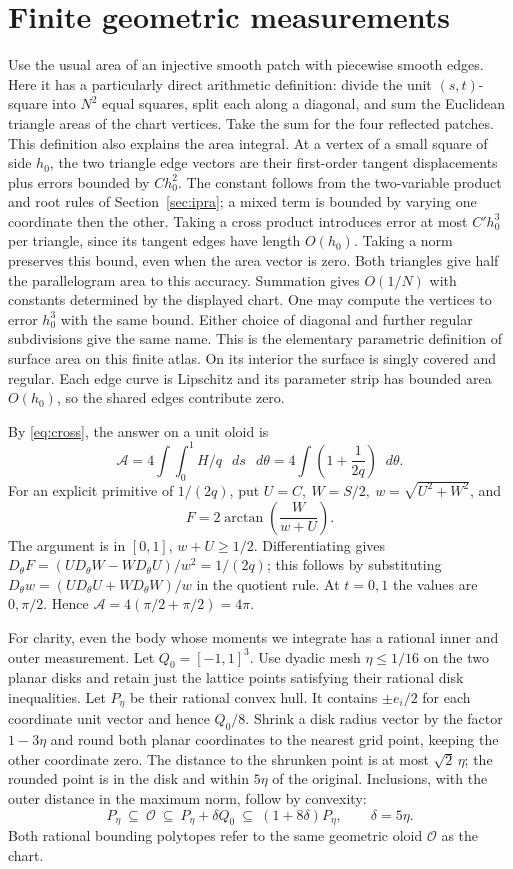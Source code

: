 \documentclass[11pt,letterpaper]{article}
\newcommand{\sect}[1]{\section[#1]{\color{ink}#1}}
\newcommand{\subt}[1]{\par\medskip\noindent{\color{sea}\bfseries #1}\enspace}
\newcommand{\dd}{\mathop{}\!d}
\newcommand{\Dth}{D_{\theta}}
\begin{document}
\newpage
\sect{Finite geometric measurements}\label{sec:measure}
\subt{Area.}
Use the usual area of an injective smooth patch with piecewise smooth edges. Here it has a particularly direct arithmetic definition: divide the unit \((s,t)\)-square into \(N^2\) equal squares, split each along a diagonal, and sum the Euclidean triangle areas of the chart vertices. Take the sum for the four reflected patches. This definition also explains the area integral. At a vertex of a small square of side \(h_0\), the two triangle edge vectors are their first-order tangent displacements plus errors bounded by \(Ch_0^2\). The constant follows from the two-variable product and root rules of Section~\ref{sec:ipra}; a mixed term is bounded by varying one coordinate then the other. Taking a cross product introduces error at most \(C' h_0^3\) per triangle, since its tangent edges have length \(O(h_0)\). Taking a norm preserves this bound, even when the area vector is zero. Both triangles give half the parallelogram area to this accuracy. Summation gives \(O(1/N)\) with constants determined by the displayed chart. One may compute the vertices to error \(h_0^3\) with the same bound. Either choice of diagonal and further regular subdivisions give the same name. This is the elementary parametric definition of surface area on this finite atlas. On its interior the surface is singly covered and regular. Each edge curve is Lipschitz and its parameter strip has bounded area \(O(h_0)\), so the shared edges contribute zero.

By \eqref{eq:cross}, the answer on a unit oloid is
\[
 \mathcal A=4\int\!\int_0^1 H/q\,\dd s\,\dd\theta
       =4\int\left(1+\frac1{2q}\right)\dd\theta .
\]
For an explicit primitive of \(1/(2q)\), put \(U=C,\ W=S/2,\ w=\sqrt{U^2+W^2}\), and
\[
 F=2\arctan\!\left(\frac{W}{w+U}\right).
\]
The argument is in \([0,1]\), \(w+U\ge1/2\). Differentiating gives
\(\Dth F=(U\Dth W-W\Dth U)/w^2=1/(2q)\);
this follows by substituting \(\Dth w=(U\Dth U+W\Dth W)/w\) in the quotient rule. At \(t=0,1\) the values are \(0,\pi/2\). Hence \(\mathcal A=4(\pi/2+\pi/2)=4\pi\).

\subt{An independent solid-volume definition.}
For clarity, even the body whose moments we integrate has a rational inner and outer measurement. Let \(Q_0=[-1,1]^3\). Use dyadic mesh \(\eta\le1/16\) on the two planar disks and retain just the lattice points satisfying their rational disk inequalities. Let \(P_\eta\) be their rational convex hull. It contains \(\pm e_i/2\) for each coordinate unit vector and hence \(Q_0/8\). Shrink a disk radius vector by the factor \(1-3\eta\) and round both planar coordinates to the nearest grid point, keeping the other coordinate zero. The distance to the shrunken point is at most \(\sqrt2\,\eta\); the rounded point is in the disk and within \(5\eta\) of the original. Inclusions, with the outer distance in the maximum norm, follow by convexity:
\[
 P_\eta\ \subseteq\ \mathcal O\ \subseteq\
 P_\eta+\delta Q_0\ \subseteq\ (1+8\delta)P_\eta,\qquad \delta=5\eta .
\]
Both rational bounding polytopes refer to the same geometric oloid \(\mathcal O\) as the chart.
\end{document}
